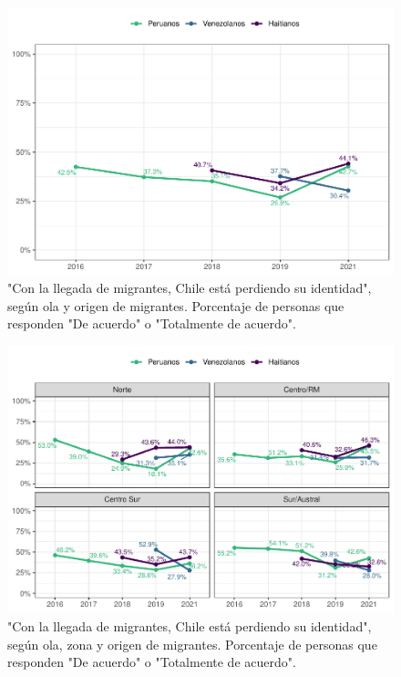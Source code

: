 \documentclass[
  12pt,
]{book}
\begin{document}
\begin{figure}

{\centering \includegraphics{reporte-elsoc_files/figure-latex/amen2-wave-1} 

}

\caption{"Con la llegada de migrantes, Chile está perdiendo su identidad", según ola y origen de migrantes. Porcentaje de personas que responden "De acuerdo" o "Totalmente de acuerdo".}\label{fig:amen2-wave}
\end{figure}

\begin{figure}

{\centering \includegraphics{reporte-elsoc_files/figure-latex/amen2-zona-1} 

}

\caption{"Con la llegada de migrantes, Chile está perdiendo su identidad", según ola, zona y origen de migrantes. Porcentaje de personas que responden "De acuerdo" o "Totalmente de acuerdo".}\label{fig:amen2-zona}
\end{figure}
\end{document}

